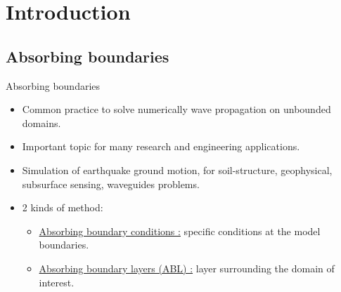 \section{Introduction}
\subsection{Absorbing boundaries}
\begin{frame}{Absorbing boundaries}
    \begin{itemize}[<+->]
        \item Common practice to solve numerically wave propagation on unbounded domains.
        \item Important topic for many research and engineering applications.
        \item Simulation of earthquake ground motion, for soil-structure, geophysical, subsurface sensing, waveguides problems.
        \pause
        \vspace{0.7cm}
        \item 2 kinds of method:
        \begin{itemize}[<+->]
        \pause
            \item \underline{Absorbing boundary conditions :} specific conditions at the model boundaries.
        \pause
            \item \underline{Absorbing boundary layers (ABL) :} layer surrounding the domain of interest.
        \end{itemize}    
    \end{itemize}
\end{frame}

